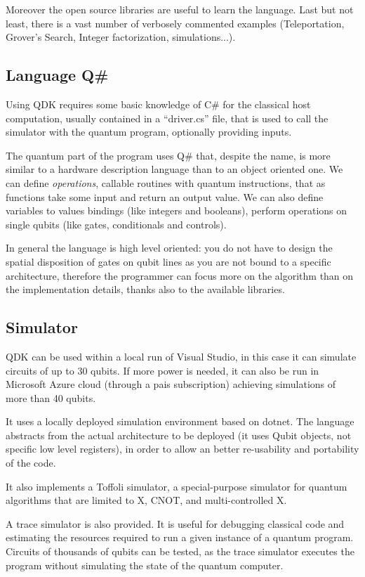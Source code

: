 Moreover the open source libraries are useful to learn the language. Last but not least, there is a vast number of verbosely commented examples (Teleportation, Grover's Search, Integer factorization, simulations...).

\subsection{Language Q\#}

Using QDK requires some basic knowledge of C\# for the classical host computation, usually contained in a ``driver.cs'' file, that is used to call the simulator with the quantum program, optionally providing inputs.

The quantum part of the program uses Q\# that, despite the name, is more similar to a hardware description language than to an object oriented one. We can define \textit{operations}, callable routines with quantum instructions, that as functions take some input and return an output value. We can also define variables to values bindings (like integers and booleans), perform operations on single qubits (like gates, conditionals and controls).

In general the language is high level oriented: you do not have to design the spatial disposition of gates on qubit lines as you are not bound to a specific architecture, therefore the programmer can focus more on the algorithm than on the implementation details, thanks also to the available libraries.

\subsection{Simulator}

QDK can be used within a local run of Visual Studio, in this case it can simulate circuits of up to 30 qubits. If more power is needed, it can also be run in Microsoft Azure cloud (through a pais subscription) achieving simulations of more than 40 qubits.

It uses a locally deployed simulation environment based on dotnet. The language abstracts from the actual architecture to be deployed (it uses Qubit objects, not specific low level registers), in order to allow an better re-usability and portability of the code.

It also implements a Toffoli simulator, a special-purpose simulator for quantum algorithms that are limited to X, CNOT, and multi-controlled X.

A trace simulator is also provided. It is useful for debugging classical code and estimating the resources required to run a given instance of a quantum program. Circuits of thousands of qubits can be tested, as the trace simulator executes the program without simulating the state of the quantum computer.

